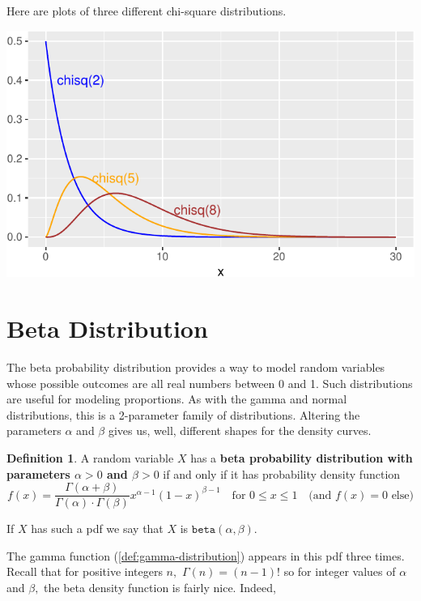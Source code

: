 \documentclass[
]{book}
\theoremstyle{definition}
\newtheorem{definition}{Definition}[chapter]
\theoremstyle{definition}
\theoremstyle{definition}
\theoremstyle{definition}
\theoremstyle{remark}
\begin{document}
Here are plots of three different chi-square distributions.

\begin{center}\includegraphics{math340-notes_files/figure-latex/unnamed-chunk-21-1} \end{center}

\section{Beta Distribution}\label{beta-distribution}

The beta probability distribution provides a way to model random variables whose possible outcomes are all real numbers between 0 and 1. Such distributions are useful for modeling proportions. As with the gamma and normal distributions, this is a 2-parameter family of distributions. Altering the parameters \(\alpha\) and \(\beta\) gives us, well, different shapes for the density curves.

\begin{definition}
\protect\hypertarget{def:beta-distribution}{}\label{def:beta-distribution}A random variable \(X\) has a \textbf{beta probability distribution with parameters \(\alpha>0\) and \(\beta>0\)} if and only if it has probability density function
\[
f(x)=
\frac{\Gamma(\alpha + \beta)}{\Gamma(\alpha)\cdot \Gamma(\beta)}x^{\alpha-1}(1-x)^{\beta-1}~~~ \text{ for }0 \leq x \leq 1~~~ \text{ (and }f(x) = 0\text{ else)}
\]

If \(X\) has such a pdf we say that \(X\) is \(\texttt{beta}(\alpha,\beta)\).
\end{definition}

The gamma function (\ref{def:gamma-distribution}) appears in this pdf three times. Recall that for positive integers \(n,\) \(\Gamma(n) = (n-1)!\) so for integer values of \(\alpha\) and \(\beta,\) the beta density function is fairly nice.
Indeed,
\end{document}
